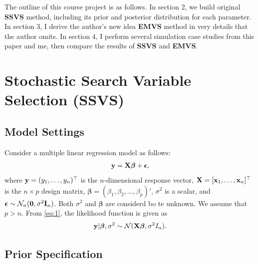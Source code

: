 \documentclass[]{book}
\begin{document}
The outline of this course project is as follows. In section 2, we build original \textbf{SSVS} method, including its prior and posterior distribution for each parameter. In section 3, I derive the author's new idea \textbf{EMVS} method in very details that the author omits. In section 4, I perform several simulation case studies from this paper and me, then compare the results of \textbf{SSVS} and \textbf{EMVS}.

\hypertarget{stochastic-search-variable-selection-ssvs}{%
\section{Stochastic Search Variable Selection (SSVS)}\label{stochastic-search-variable-selection-ssvs}}

\hypertarget{model-settings}{%
\subsection{Model Settings}\label{model-settings}}

Consider a multiple linear regression model as follows:
\begin{eqnarray}
    {\bf y}={\bf X}{\boldsymbol \beta}+ {\boldsymbol \epsilon},
    \label{eq:1}
    \end{eqnarray}
where \({\bf y}=(y_1,\ldots,y_n)^{{\top}}\) is the \(n\)-dimensional response vector, \({\bf X}=[{\bf x}_1,\ldots,{\bf x}_n]^{{\top}}\) is the \(n\times p\) design
matrix, \({\boldsymbol \beta}=(\beta_1, \beta_2, \ldots, \beta_p)'\), \(\sigma^2\) is a scalar, and \({\boldsymbol \epsilon}\sim \mathcal{N}_n({\bf 0},\sigma^2{\bf I}_n)\).
Both \(\sigma^2\) and \({\boldsymbol \beta}\) are considerd bo te unknown. We assume that \(p>n\).
From \eqref{eq:1}, the likelihood function is given as
\begin{eqnarray}
    {\bf y}|{\boldsymbol \beta}, \sigma^2 \sim \mathcal{N}({\bf X}{\boldsymbol \beta}, \sigma^2I_n).
    \end{eqnarray}

\subsection{Prior Specification}
\end{document}
